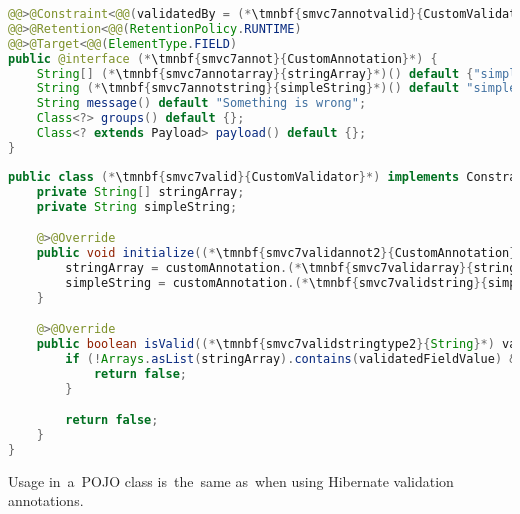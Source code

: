 \example
\begin{lstlisting}[language=Java, title={Custom validation annotation class}]
@@>@Constraint<@@(validatedBy = (*\tmnbf{smvc7annotvalid}{CustomValidator}*))
@@>@Retention<@@(RetentionPolicy.RUNTIME)
@@>@Target<@@(ElementType.FIELD)
public @interface (*\tmnbf{smvc7annot}{CustomAnnotation}*) {
    String[] (*\tmnbf{smvc7annotarray}{stringArray}*)() default {"simpleArrayMember"};
    String (*\tmnbf{smvc7annotstring}{simpleString}*)() default "simpleStringValue";
    String message() default "Something is wrong";
    Class<?> groups() default {};
    Class<? extends Payload> payload() default {};
}
\end{lstlisting}
\begin{lstlisting}[language=Java, title={Custom validator class, validated field must contain either a~value from the~array or~must~be equal to~the~simple string}]
public class (*\tmnbf{smvc7valid}{CustomValidator}*) implements ConstraintValidator<(*\tmnbf{smvc7validannot1}{CustomAnnotation}*), (*\tmnbf{smvc7validstringtype1}{String}*)> {
    private String[] stringArray;
    private String simpleString;

    @>@Override
    public void initialize((*\tmnbf{smvc7validannot2}{CustomAnnotation}*) customAnnotation) {
        stringArray = customAnnotation.(*\tmnbf{smvc7validarray}{stringArray}*)();
        simpleString = customAnnotation.(*\tmnbf{smvc7validstring}{simpleString}*)();
    }

    @>@Override
    public boolean isValid((*\tmnbf{smvc7validstringtype2}{String}*) validatedFieldValue, ConstraintValidatorContext context) {
        if (!Arrays.asList(stringArray).contains(validatedFieldValue) && (!simpleString.equals(validatedFieldValue)) {
            return false;
        }

        return false;
    }
}
\end{lstlisting}
\noindent Usage in~a~POJO class is~the~same as~when using Hibernate validation annotations.
\newpage
